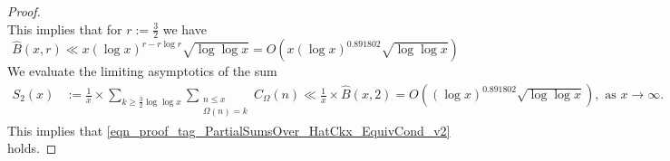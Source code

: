 \documentclass[11pt,reqno,a4letter]{article}
\numberwithin{figure}{section}
\numberwithin{table}{section}
\theoremstyle{plain}
\numberwithin{theorem}{section}
\theoremstyle{definition}
\begin{document}
\begin{proof}
\[\]
This implies that for $r := \frac{3}{2}$ we have 
\begin{equation}
\label{eqn_BHatxrUpperBound_v1}
\widehat{B}(x, r) \ll x (\log x)^{r-r\log r} \sqrt{\log\log x} = 
     O\left(x (\log x)^{0.891802} \sqrt{\log\log x}\right)
\end{equation}
We evaluate the limiting asymptotics of the sum 
\begin{align*}
S_2(x) & := \frac{1}{x} \times 
     \sum_{k \geq \frac{3}{2} \log\log x} \sum_{\substack{n \leq x \\ \Omega(n)=k}} 
     C_{\Omega}(n) \ll \frac{1}{x} \times \widehat{B}(x, 2) = 
     O\left((\log x)^{0.891802} \sqrt{\log\log x}\right), 
     \text{ as } x \rightarrow \infty. 
\end{align*} 
This implies that 
\eqref{eqn_proof_tag_PartialSumsOver_HatCkx_EquivCond_v2} holds. 
\end{proof} 
\end{document}
